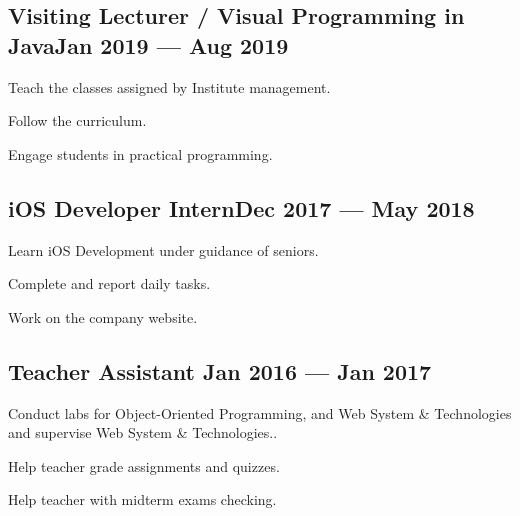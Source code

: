 \documentclass[letter,10pt]{article}
\begin{document}
\subsection{{Visiting Lecturer / Visual Programming in Java\hfill Jan 2019 --- Aug 2019}}
\begin{zitemize}
\item Teach the classes assigned by Institute management.
\item Follow the curriculum.
\item Engage students in practical programming.
\end{zitemize}

\subsection{{iOS Developer Intern\hfill Dec 2017 --- May 2018}}
\begin{zitemize}
\item Learn iOS Development under guidance of seniors.
\item Complete and report daily tasks.
\item Work on the company website.
\end{zitemize}

\subsection{{Teacher Assistant \hfill Jan 2016 --- Jan 2017}}
\begin{zitemize}
\item Conduct labs for Object-Oriented Programming, and Web System \& Technologies and supervise Web System \& Technologies..
\item Help teacher grade assignments and quizzes.
\item Help teacher with midterm exams checking.
\end{zitemize}
\end{document}
